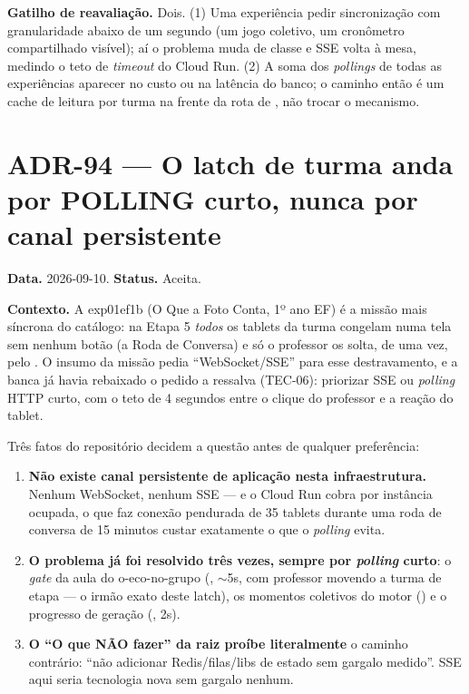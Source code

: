 \textbf{Gatilho de reavaliação.} Dois. (1) Uma experiência pedir sincronização
com granularidade abaixo de um segundo (um jogo coletivo, um cronômetro
compartilhado visível); aí o problema muda de classe e SSE volta à mesa,
medindo o teto de \emph{timeout} do Cloud Run. (2) A soma dos \emph{pollings} de
todas as experiências aparecer no custo ou na latência do banco; o caminho
então é um cache de leitura por turma na frente da rota de , não trocar
o mecanismo.

\section{ADR-94 --- O latch de turma anda por POLLING curto, nunca por canal
persistente}
\label{adr:latch-por-polling}

\textbf{Data.} 2026-09-10. \textbf{Status.} Aceita.

\textbf{Contexto.} A exp01ef1b (O Que a Foto Conta, 1º ano EF) é a missão mais
síncrona do catálogo: na Etapa 5 \emph{todos} os tablets da turma congelam numa
tela sem nenhum botão (a Roda de Conversa) e só o professor os solta, de uma
vez, pelo . O insumo da missão pedia
\enquote{WebSocket/SSE} para esse destravamento, e a banca já havia rebaixado o
pedido a ressalva (TEC-06): priorizar SSE ou \emph{polling} HTTP curto, com o
teto de 4 segundos entre o clique do professor e a reação do tablet.

Três fatos do repositório decidem a questão antes de qualquer preferência:

\begin{enumerate}
  \item \textbf{Não existe canal persistente de aplicação nesta
    infraestrutura.} Nenhum WebSocket, nenhum SSE --- e o Cloud Run cobra por
    instância ocupada, o que faz conexão pendurada de 35 tablets durante uma
    roda de conversa de 15 minutos custar exatamente o que o \emph{polling}
    evita.
  \item \textbf{O problema já foi resolvido três vezes, sempre por
    \emph{polling} curto}: o \emph{gate} da aula do o-eco-no-grupo
    (, \(\sim\)5s, com professor movendo a turma
    de etapa --- o irmão exato deste latch), os momentos coletivos do motor
    () e o progresso de geração (, 2s).
  \item \textbf{O \enquote{O que NÃO fazer} da raiz proíbe literalmente} o
    caminho contrário: \enquote{não adicionar Redis/filas/libs de estado sem
    gargalo medido}. SSE aqui seria tecnologia nova sem gargalo nenhum.
\end{enumerate}

